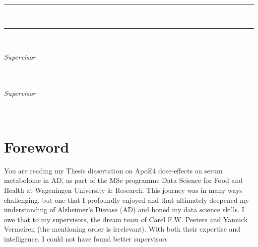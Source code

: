 \documentclass{amsart}
\newcommand{\frontmatter}{
    \pagenumbering{roman}   %
}
\begin{document}
\begin{titlepage}
\vspace{1cm}
\begin{center}
\par
\noindent
\rule[0.2cm]{\linewidth}{1.5pt}
\Huge
\textbf{\thesisTitle}
\vspace{0.2cm}
\LARGE
\par
\noindent
\thesisSubTitle\\
\rule[0.2cm]{\linewidth}{1.5pt}
\Large
\end{center}


\vspace{2cm}
\noindent
\LARGE
\thesisAuthor\\
\vspace{.2 cm}
\small
\par \noindent
\thesisDegree
\par \noindent
\university
\par \noindent
\thesisPlaceDate


\vspace{4cm}
\begin{flushright}
\emph{Supervisor} \\
\textbf{\supervisor} \\
\departmentSUP\\
\universitySUP
\end{flushright}

\vspace{.5cm}
\begin{flushright}
\emph{Supervisor} \\
\textbf{\cosupervisor} \\
\departmentCOSUP \\
\universityCOSUP
\end{flushright}
\end{titlepage}
\frontmatter
\section*{Foreword}
You are reading my Thesis dissertation on ApoE4 dose-effects on serum metabolome in AD, as part of the MSc programme Data Science for Food and Health at Wageningen University \& Research. This journey was in many ways challenging, but one that I profoundly enjoyed and that ultimately  deepened my understanding of Alzheimer's Disease (AD) and honed my data science skills. I owe that to my supervisors, the dream team of Carel F.W. Peeters and Yannick Vermeiren (the mentioning order is irrelevant). With both their expertise and intelligence, I could not have found better supervisors
\end{document}
